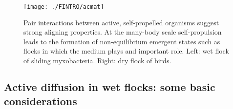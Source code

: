 \documentclass[amssymb]{revtex4}
\begin{document}
  \begin{figure}
\begin{center}
\texttt{[image: ./FINTRO/acmat]}
\caption{ \label{introfig7} Pair interactions between active, self-propelled organisms suggest strong aligning properties. At the many-body scale self-propulsion leads to the formation of non-equilibrium emergent states such as flocks in which the medium plays and important role. Left:  wet flock of sliding myxobacteria.   Right: dry flock of birds.  }
\end{center}
\end{figure}
   



  
  \subsection{Active diffusion in wet flocks: some basic  considerations}
\end{document}
